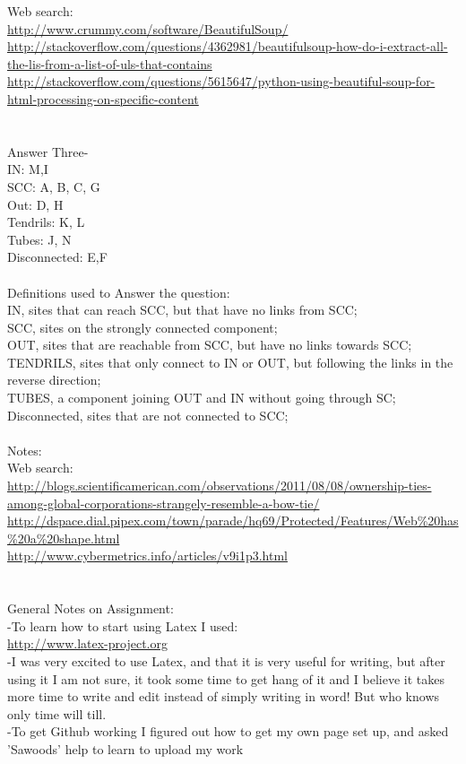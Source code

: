 \documentclass[11pt]{article}
\begin{document}
Web search:\\
\url{http://www.crummy.com/software/BeautifulSoup/}\\
\url{http://stackoverflow.com/questions/4362981/beautifulsoup-how-do-i-extract-all-the-lis-from-a-list-of-uls-that-contains}\\
\url{http://stackoverflow.com/questions/5615647/python-using-beautiful-soup-for-html-processing-on-specific-content}\\
\\
\pagebreak
\\
Answer Three-\\
IN: M,I\\
SCC: A, B, C, G\\
Out: D, H\\
Tendrils: K, L\\
Tubes: J, N\\
Disconnected: E,F\\
\\
Definitions used to Answer the question:\\
IN, sites that can reach SCC, but that have no links from SCC;\\
SCC, sites on the strongly connected component;\\
OUT, sites that are reachable from SCC, but have no links towards SCC;\\
TENDRILS, sites that only connect to IN or OUT, but following the links in the reverse direction;\\
TUBES, a component joining OUT and IN without going through SC;\\
Disconnected, sites that are not connected to SCC;\\
\\
Notes:\\
Web search:\\
\url{http://blogs.scientificamerican.com/observations/2011/08/08/ownership-ties-among-global-corporations-strangely-resemble-a-bow-tie/}\\
\url{http://dspace.dial.pipex.com/town/parade/hq69/Protected/Features/Web%20has%20a%20shape.html}\\
\url{http://www.cybermetrics.info/articles/v9i1p3.html}\\
\\
\\
General Notes on Assignment:\\
-To learn how to start using Latex I used:\\ 
\url{http://www.latex-project.org}\\
-I was very excited to use Latex, and that it is very useful for writing, but after using it I am not sure, it took some time to get hang of it and I believe it takes more time to write and edit instead of simply writing in word! But who knows only time will till.\\
-To get Github working I figured out how to get my own page set up, and asked 'Sawoods' help to learn to upload my work\\
\end{document}
